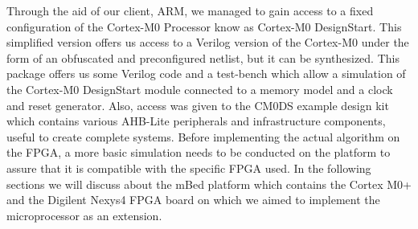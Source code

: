 Through the aid of our client, ARM, we managed to gain access to a fixed configuration of the Cortex-M0 Processor know as Cortex-M0 DesignStart. This simplified version offers us access to a Verilog version of the Cortex-M0 under the form of an obfuscated and preconfigured netlist, but it can be synthesized. This package offers us some Verilog code and a test-bench which allow a simulation of the Cortex-M0 DesignStart module connected to a memory model and a clock and reset generator. Also, access was given to the CM0DS example design kit which contains various AHB-Lite peripherals and infrastructure components, useful to create complete systems. Before implementing the actual algorithm on the FPGA, a more basic simulation needs to be conducted on the platform to assure that it is compatible with the specific FPGA used. In the following sections we will discuss about the mBed platform which contains the Cortex M0+ and the Digilent Nexys4 FPGA board on which we aimed to implement the microprocessor as an extension.
